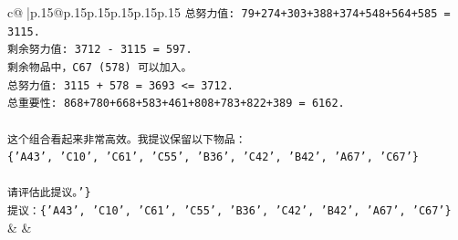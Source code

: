 \documentclass{article}
\begin{document}
{\begin{supertabular}{c@{$\;$}|p{.15\linewidth}@{}p{.15\linewidth}p{.15\linewidth}p{.15\linewidth}p{.15\linewidth}p{.15\linewidth}}
{{{\texttt{总努力值: 79+274+303+388+374+548+564+585 = 3115.} \\
\texttt{剩余努力值: 3712 {-} 3115 = 597.} \\
\texttt{剩余物品中，C67 (578) 可以加入。} \\
\texttt{总努力值: 3115 + 578 = 3693 <= 3712.} \\
\texttt{总重要性: 868+780+668+583+461+808+783+822+389 = 6162.} \\
\\ 
\texttt{这个组合看起来非常高效。我提议保留以下物品：} \\
\texttt{\{'A43', 'C10', 'C61', 'C55', 'B36', 'C42', 'B42', 'A67', 'C67'\}} \\
\\ 
\texttt{请评估此提议。'\}} \\
\texttt{提议：\{'A43', 'C10', 'C61', 'C55', 'B36', 'C42', 'B42', 'A67', 'C67'\}} \\
            }
        }
    }
    & & \\ \\


\end{supertabular}}
\end{document}
